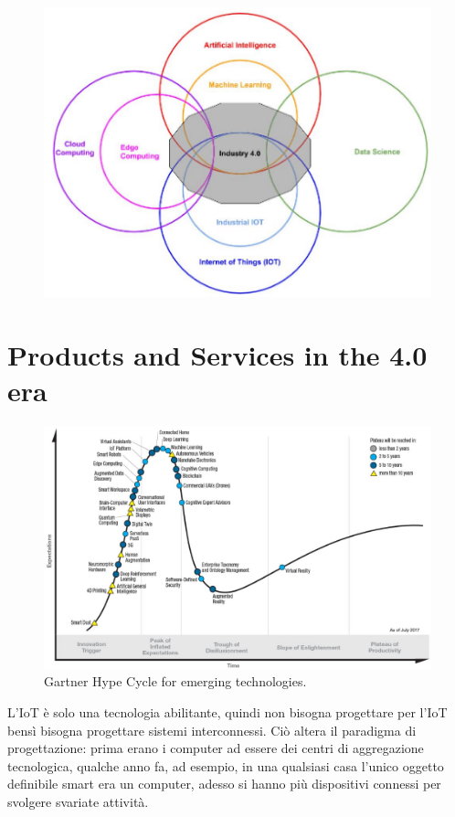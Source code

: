 \documentclass[a4paper,11pt,oneside]{book}
\begin{document}
\begin{figure}[!h]
	\centering
	\includegraphics[scale=0.55]{immagini/Holistic.png}
\end{figure}

\pagebreak

\section{Products and Services in the 4.0 era}

\begin{figure}[!h]
	\centering
	\includegraphics[scale=0.45]{immagini/Hype.png}
	\caption{Gartner Hype Cycle for emerging technologies.}
\end{figure}

L'IoT è solo una tecnologia abilitante, quindi non bisogna progettare per l'IoT bensì bisogna progettare sistemi interconnessi. Ciò altera il paradigma di progettazione: prima erano i computer ad essere dei centri di aggregazione tecnologica, qualche anno fa, ad esempio, in una qualsiasi casa l'unico oggetto definibile smart era un computer, adesso si hanno più dispositivi connessi per svolgere svariate attività.
\end{document}
